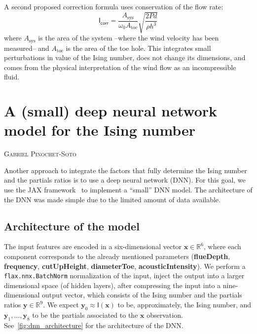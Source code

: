 \documentclass{psu-report}
\newcommand{\chapterauthor}[1]{%
  \vspace{-2em}
  {\large \textsc{#1}\par}
  \vspace{1.5em}
}
\begin{document}
A second proposed correction formula uses conservation of the flow rate:
\begin{equation}
    \label{eq:ising_correction2}
    \mathsf{I}_\mathsf{corr} = 
    \frac{A_{\mathrm{sys}}}{\omega_0 A_{\mathrm{toe}}}\sqrt{\frac{2 P d}{\rho h^3}}
\end{equation}
where \(A_{\mathrm{sys}}\) is the area of the system --where the wind velocity
has been measured-- and \(A_{\mathrm{toe}}\) is the area of the toe hole.
This integrates small perturbations in value of the Ising number, does not
change its dimensions, and comes from the physical interpretation of the
wind flow as an incompressible fluid.



\chapter[DNN model for Ising number]{A (small) deep neural network model for the Ising number}
\chapterauthor{Gabriel Pinochet-Soto}

Another approach to integrate the factors that fully determine the Ising number
and the partials ratios is to use a deep neural network (DNN).
For this goal, we use the JAX framework~\autocite{2018Jax-1, 2020Optax-1,
2024Flax-1} to implement a ``small'' DNN model.
The architecture of the DNN was made simple due to the limited amount of data
available.

\section{Architecture of the model}

The input features are encoded in a six-dimensional vector
\(\mathbf{x} \in \mathbb{R}^6\), where each component corresponds to the
already mentioned parameters (\textbf{flueDepth}, \textbf{frequency},
\textbf{cutUpHeight}, \textbf{diameterToe}, \textbf{acousticIntensity}).
We perform a \texttt{flax.nnx.BatchNorm} normalization of the input,
inject the output into a larger dimensional space (of hidden layers),
after compressing the input into a nine-dimensional output vector,
which consists of the Ising number and the partials ratios
\(\mathbf{y} \in \mathbb{R}^9\).
We expect \(\mathbf{y}_0 \approx \mathsf{I}(\mathbf{x})\) to be, approximately,
the Ising number, and \(\mathbf{y}_1, \ldots, \mathbf{y}_8\) to be the partials
associated to the \(\mathbf{x}\) observation.
See~\autoref{fig:dnn_architecture} for the architecture of the DNN.
\end{document}
